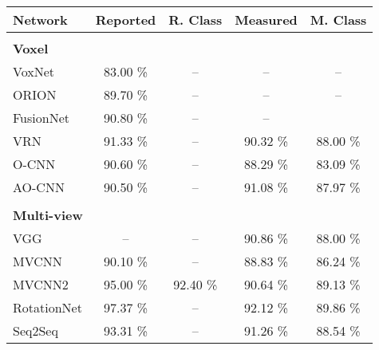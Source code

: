 \begin{table}[]
	\centering
	\begin{tabular}{lcccc}
		\hline
		\textbf{Network}     & \textbf{Reported } & \textbf{R. Class} & \textbf{Measured} & \textbf{M. Class} \\ \hline
		                     &                    &                         &                   &                         \\
		\textbf{Voxel }      &                    &                         &                   &                         \\
		VoxNet               &      83.00 \%      &           --            &        --         &           --            \\
		ORION                &      89.70 \%      &           --            &        --         &           --            \\
		FusionNet            &      90.80 \%      &           --            &        --         &                         \\
		VRN                  &      91.33 \%      &           --            &     90.32 \%      &        88.00 \%         \\
		O-CNN                &      90.60 \%      &           --            &     88.29 \%      &        83.09 \%         \\
		AO-CNN               &      90.50 \%      &           --            &     91.08 \%      &        87.97 \%         \\ \hline
		                     &                    &                         &                   &                         \\
		\textbf{Multi-view}  &                    &                         &                   &                         \\
		VGG                  &         --         &           --            &     90.86 \%      &        88.00 \%         \\
		MVCNN                &      90.10 \%      &           --            &     88.83 \%      &        86.24 \%         \\
		MVCNN2               &      95.00 \%      &        92.40 \%         &     90.64 \%      &        89.13 \%         \\
		RotationNet          &      97.37 \%      &           --            &     92.12 \%      &        89.86 \%         \\
		Seq2Seq              &      93.31 \%      &           --            &     91.26 \%      &        88.54 \%         \\ \hline

\end{tabular}
\end{table}
